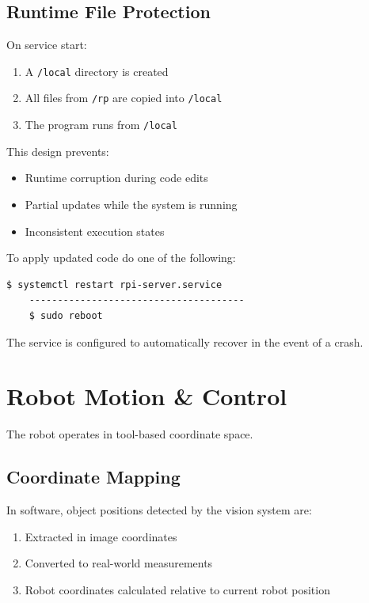 \documentclass{ol-softwaremanual}
\begin{document}
\subsection{Runtime File Protection}
On service start:
\begin{enumerate}
    \item A \lstinline{/local} directory is created
    \item All files from \lstinline{/rp} are copied into \lstinline{/local}
    \item The program runs from \lstinline{/local}
\end{enumerate}

This design prevents:
\begin{itemize}
    \item Runtime corruption during code edits
    \item Partial updates while the system is running
    \item Inconsistent execution states
\end{itemize}

To apply updated code do one of the following:
\begin{lstlisting}[language=bash, caption="Updating Raspberry Pi code]
    $ systemctl restart rpi-server.service
    --------------------------------------
    $ sudo reboot
\end{lstlisting}

The service is configured to automatically recover in the event of a crash.


\section{Robot Motion \& Control}

The robot operates in tool-based coordinate space.

\subsection{Coordinate Mapping}

In software, object positions detected by the vision system are: 
\begin{enumerate}
    \item Extracted in image coordinates
    \item Converted to real-world measurements
    \item Robot coordinates calculated relative to current robot position
\end{enumerate}
\end{document}
